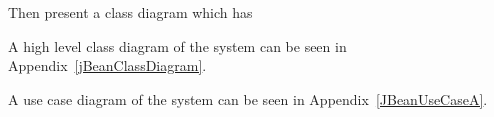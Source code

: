 \documentclass[a4paper, 11pt]{article}
\begin{document}
Then present a class diagram which has 

\vspace{5mm}
A high level class diagram of the system can be seen in Appendix~\ref{jBeanClassDiagram}.

\vspace{5mm}
A use case diagram of the system can be seen in Appendix~\ref{JBeanUseCaseA}.
\end{document}
